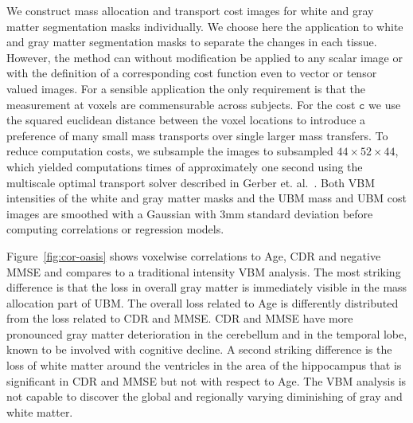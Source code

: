 \documentclass{llncs}
\newcommand{\cost}[0]{\mathtt{c}}
\begin{document}
We construct mass allocation and transport cost images for white and
gray matter segmentation masks individually. We choose here the application to
white and gray matter segmentation masks to separate the changes in each
tissue. However, the method can without modification be applied to any scalar
image or with the definition of a corresponding cost function even to vector or
tensor valued images. For a sensible application the only requirement is that
the measurement at voxels are commensurable across subjects. For the cost
$\cost$ we use the squared euclidean distance between the voxel locations to
introduce a preference of many small mass transports over single larger mass
transfers.  To reduce computation costs, we subsample the images to subsampled
$44 \times 52 \times 44$, which yielded computations times of approximately one
second using the multiscale optimal transport solver described in Gerber et.
al.~\cite{gerber2017multiscale}. Both VBM intensities of the white and gray
matter masks and the UBM mass and UBM cost images are smoothed with a Gaussian
with 3mm standard deviation before computing correlations or regression models.

Figure~\ref{fig:cor-oasis} shows voxelwise correlations to Age, CDR and
negative MMSE and compares to a traditional intensity VBM analysis. The most
striking difference is that the loss in overall gray matter is immediately
visible in the mass allocation part of UBM. The overall loss related to Age is
differently distributed from the loss related to CDR and MMSE. CDR and MMSE
have more pronounced gray matter deterioration in the cerebellum and in the
temporal lobe, known to be involved with cognitive decline. A second striking
difference is the loss of white matter around the ventricles in the area of the
hippocampus that is significant in CDR and MMSE but not with respect to Age.
The VBM analysis is not capable to discover the global and regionally varying
diminishing of gray and white matter. 
\end{document}
